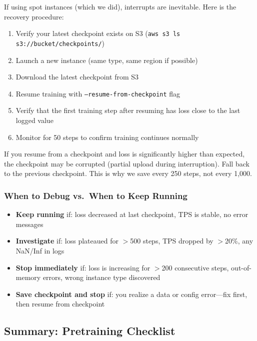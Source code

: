 \documentclass[11pt,a4paper]{article}
\begin{document}
If using spot instances (which we did), interrupts are inevitable. Here is the recovery procedure:

\begin{enumerate}[nosep]
  \item Verify your latest checkpoint exists on S3 (\texttt{aws s3 ls s3://bucket/checkpoints/})
  \item Launch a new instance (same type, same region if possible)
  \item Download the latest checkpoint from S3
  \item Resume training with \texttt{--resume-from-checkpoint} flag
  \item Verify that the first training step after resuming has loss close to the last logged value
  \item Monitor for 50 steps to confirm training continues normally
\end{enumerate}

\begin{warning}
If you resume from a checkpoint and loss is significantly higher than expected, the checkpoint may be corrupted (partial upload during interruption). Fall back to the previous checkpoint. This is why we save every 250 steps, not every 1,000.
\end{warning}

\subsubsection{When to Debug vs.\ When to Keep Running}

\begin{itemize}[nosep]
  \item \textbf{Keep running} if: loss decreased at last checkpoint, TPS is stable, no error messages
  \item \textbf{Investigate} if: loss plateaued for $>$500 steps, TPS dropped by $>$20\%, any NaN/Inf in logs
  \item \textbf{Stop immediately} if: loss is increasing for $>$200 consecutive steps, out-of-memory errors, wrong instance type discovered
  \item \textbf{Save checkpoint and stop} if: you realize a data or config error---fix first, then resume from checkpoint
\end{itemize}

\subsection{Summary: Pretraining Checklist}
\end{document}
